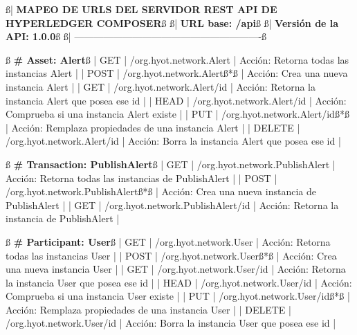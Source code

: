 \documentclass[12pt,a4paper, twoside]{report}
\begin{document}
\begin{listing}[style=consola, basicstyle=\ttfamily\scriptsize, numbers=none, escapechar=ß]
ß{\color{ballblue}| \textbf{MAPEO DE URLS DEL SERVIDOR REST API DE HYPERLEDGER COMPOSER}}ß
ß{\color{ballblue}| \textbf{URL base: /api}}ß
ß{\color{ballblue}| \textbf{Versión de la API: 1.0.0}}ß
ß{\color{ballblue}| ----------------------------------------------------------}ß

ß\textbf{{\color{maroon} \# Asset: Alert}}ß
| GET    | /org.hyot.network.Alert         | Acción: Retorna todas las instancias Alert               |
| POST   | /org.hyot.network.Alertß{\color{red}*}ß        | Acción: Crea una nueva instancia Alert                   |
| GET    | /org.hyot.network.Alert/{id}    | Acción: Retorna la instancia Alert que posea ese id      |
| HEAD   | /org.hyot.network.Alert/{id}    | Acción: Comprueba si una instancia Alert existe          |
| PUT    | /org.hyot.network.Alert/{id}ß{\color{red}*}ß   | Acción: Remplaza propiedades de una instancia Alert      |
| DELETE | /org.hyot.network.Alert/{id}    | Acción: Borra la instancia Alert que posea ese id        |
 
 ß\textbf{{\color{maroon} \# Transaction: PublishAlert}}ß
| GET    | /org.hyot.network.PublishAlert  | Acción: Retorna todas las instancias de PublishAlert     |
| POST   | /org.hyot.network.PublishAlertß{\color{red}*}ß | Acción: Crea una nueva instancia de PublishAlert         |
| GET    | /org.hyot.network.PublishAlert/{id} | Acción: Retorna la instancia de PublishAlert         |

ß\textbf{{\color{maroon} \# Participant: User}}ß
| GET    | /org.hyot.network.User          | Acción: Retorna todas las instancias User                |
| POST   | /org.hyot.network.Userß{\color{red}*}ß         | Acción: Crea una nueva instancia User                    |
| GET    | /org.hyot.network.User/{id}     | Acción: Retorna la instancia User que posea ese id       |
| HEAD   | /org.hyot.network.User/{id}     | Acción: Comprueba si una instancia User existe           |
| PUT    | /org.hyot.network.User/{id}ß{\color{red}*}ß    | Acción: Remplaza propiedades de una instancia User       |
| DELETE | /org.hyot.network.User/{id}     | Acción: Borra la instancia User que posea ese id         |
 

\end{listing}
\end{document}
